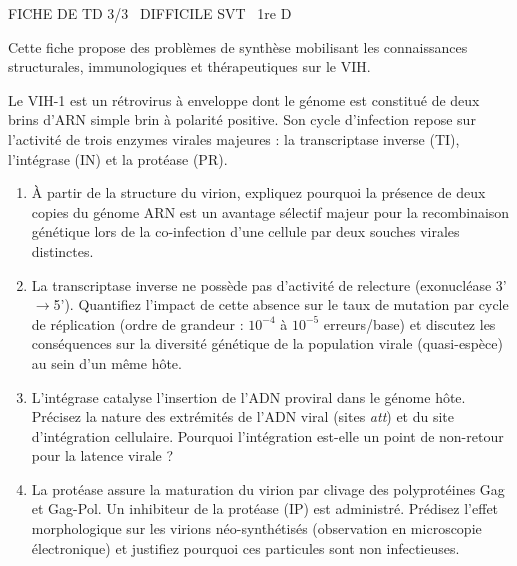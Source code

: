 \documentclass[11pt]{article}
\begin{document}
\begin{tcolorbox}[enhanced,colback=popink,colframe=popink,arc=10pt,boxrule=0pt,left=12pt,right=12pt,top=9pt,bottom=9pt]
{\color{white}\popxbold\small FICHE DE TD 3/3 \textbullet\ DIFFICILE \hfill SVT \textbullet\ 1re D\par}
\end{tcolorbox}
\vspace{4pt}
Cette fiche propose des problèmes de synthèse mobilisant les connaissances structurales, immunologiques et thérapeutiques sur le VIH.

\begin{exercice}
Le VIH-1 est un rétrovirus à enveloppe dont le génome est constitué de deux brins d'ARN simple brin à polarité positive. Son cycle d'infection repose sur l'activité de trois enzymes virales majeures : la transcriptase inverse (TI), l'intégrase (IN) et la protéase (PR).

\begin{enumerate}
    \item À partir de la structure du virion, expliquez pourquoi la présence de deux copies du génome ARN est un avantage sélectif majeur pour la recombinaison génétique lors de la co-infection d'une cellule par deux souches virales distinctes.
    \item La transcriptase inverse ne possède pas d'activité de relecture (exonucléase 3'$\to$5'). Quantifiez l'impact de cette absence sur le taux de mutation par cycle de réplication (ordre de grandeur : $10^{-4}$ à $10^{-5}$ erreurs/base) et discutez les conséquences sur la diversité génétique de la population virale (quasi-espèce) au sein d'un même hôte.
    \item L'intégrase catalyse l'insertion de l'ADN proviral dans le génome hôte. Précisez la nature des extrémités de l'ADN viral (sites \textit{att}) et du site d'intégration cellulaire. Pourquoi l'intégration est-elle un point de non-retour pour la latence virale ?
    \item La protéase assure la maturation du virion par clivage des polyprotéines Gag et Gag-Pol. Un inhibiteur de la protéase (IP) est administré. Prédisez l'effet morphologique sur les virions néo-synthétisés (observation en microscopie électronique) et justifiez pourquoi ces particules sont non infectieuses.
\end{enumerate}
\end{exercice}
\end{document}
